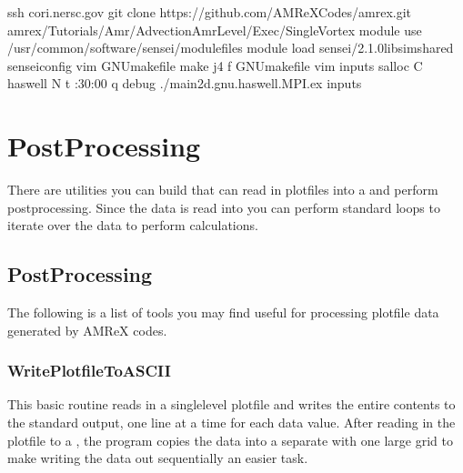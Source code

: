 \documentclass[letterpaper,10pt,english]{sphinxmanual}
\begin{document}
\begin{sphinxVerbatim}[commandchars=\\\{\}]
ssh cori.nersc.gov
 
git clone https://github.com/AMReX\PYGZhy{}Codes/amrex.git
 amrex/Tutorials/Amr/Advection\PYGZus{}AmrLevel/Exec/SingleVortex
module use /usr/common/software/sensei/modulefiles
module load sensei/2.1.0\PYGZhy{}libsim\PYGZhy{}shared
 sensei\PYGZus{}config
vim GNUmakefile
make \PYGZhy{}j4 \PYGZhy{}f GNUmakefile
vim inputs
salloc \PYGZhy{}C haswell \PYGZhy{}N  \PYGZhy{}t :30:00 \PYGZhy{}q debug
./main2d.gnu.haswell.MPI.ex inputs
\end{sphinxVerbatim}


\chapter{Post\sphinxhyphen{}Processing}
\label{\detokenize{Post_Processing_Chapter:post-processing}}\label{\detokenize{Post_Processing_Chapter:chap-post-processing}}\label{\detokenize{Post_Processing_Chapter::doc}}
\sphinxAtStartPar
There are utilities you can build that can read in plotfiles into a
 and perform post\sphinxhyphen{}processing.  Since the data is read into
 you can perform standard  loops to iterate over
the data to perform calculations.


\section{Post\sphinxhyphen{}Processing}
\label{\detokenize{Post_Processing:post-processing}}\label{\detokenize{Post_Processing:sec-postprocessing}}\label{\detokenize{Post_Processing::doc}}
\sphinxAtStartPar
The following is a list of tools you may find useful for processing
plotfile data generated by AMReX codes.


\subsection{WritePlotfileToASCII}
\label{\detokenize{Post_Processing:writeplotfiletoascii}}
\sphinxAtStartPar
This basic routine reads in a single\sphinxhyphen{}level plotfile and writes the entire contents
to the standard output, one line at a time for each data value.
After reading in the plotfile to a , the program copies the data
into a separate  with one large grid to make writing the data out
sequentially an easier task.
\end{document}
